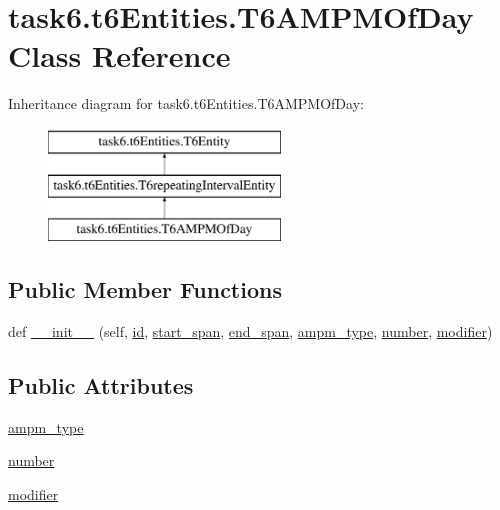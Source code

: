 \hypertarget{classtask6_1_1t6Entities_1_1T6AMPMOfDay}{}\section{task6.\+t6\+Entities.\+T6\+A\+M\+P\+M\+Of\+Day Class Reference}
\label{classtask6_1_1t6Entities_1_1T6AMPMOfDay}
Inheritance diagram for task6.\+t6\+Entities.\+T6\+A\+M\+P\+M\+Of\+Day\+:\begin{figure}[H]
\begin{center}
\leavevmode
\includegraphics[height=3.000000cm]{classtask6_1_1t6Entities_1_1T6AMPMOfDay}
\end{center}
\end{figure}
\subsection*{Public Member Functions}
\begin{DoxyCompactItemize}
\item 
def \hyperlink{classtask6_1_1t6Entities_1_1T6AMPMOfDay_a800af0268e3964a5d98d53316c1d6fd4}{\+\_\+\+\_\+init\+\_\+\+\_\+} (self, \hyperlink{classtask6_1_1t6Entities_1_1T6Entity_afeeced8134bb3ebe0cfecc64d0ab46a4}{id}, \hyperlink{classtask6_1_1t6Entities_1_1T6Entity_a52779e9af8864dc98e8b02fc5b9b041a}{start\+\_\+span}, \hyperlink{classtask6_1_1t6Entities_1_1T6Entity_aeb402200b156cd9562c5111dfe777b98}{end\+\_\+span}, \hyperlink{classtask6_1_1t6Entities_1_1T6AMPMOfDay_ad5d347e7a4819e052b39c4709d08038d}{ampm\+\_\+type}, \hyperlink{classtask6_1_1t6Entities_1_1T6AMPMOfDay_a3d94781e4fb82b58d2adc8637bf515ac}{number}, \hyperlink{classtask6_1_1t6Entities_1_1T6AMPMOfDay_a775ca0b3161fef5d092cd5364bc4a954}{modifier})
\end{DoxyCompactItemize}
\subsection*{Public Attributes}
\begin{DoxyCompactItemize}
\item 
\hyperlink{classtask6_1_1t6Entities_1_1T6AMPMOfDay_ad5d347e7a4819e052b39c4709d08038d}{ampm\+\_\+type}
\item 
\hyperlink{classtask6_1_1t6Entities_1_1T6AMPMOfDay_a3d94781e4fb82b58d2adc8637bf515ac}{number}
\item 
\hyperlink{classtask6_1_1t6Entities_1_1T6AMPMOfDay_a775ca0b3161fef5d092cd5364bc4a954}{modifier}
\end{DoxyCompactItemize}


